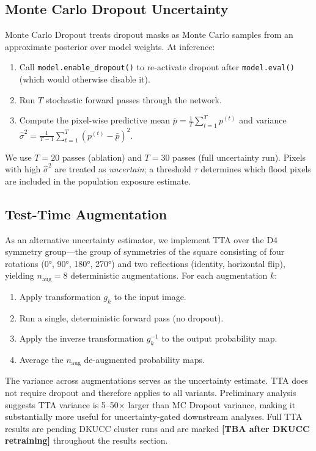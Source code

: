 \documentclass[12pt]{article}
\newcommand{\tbatxt}{\colorbox{pending}{\textbf{[TBA after DKUCC retraining]}}}
\begin{document}
\subsection{Monte Carlo Dropout Uncertainty}
\label{sec:mc}

Monte Carlo Dropout \cite{gal2016dropout} treats dropout masks as Monte Carlo
samples from an approximate posterior over model weights.  At inference:
\begin{enumerate}
  \item Call \texttt{model.enable\_dropout()} to re-activate dropout after
        \texttt{model.eval()} (which would otherwise disable it).
  \item Run $T$ stochastic forward passes through the network.
  \item Compute the pixel-wise predictive mean
        $\bar{p} = \frac{1}{T}\sum_{t=1}^{T} p^{(t)}$ and variance
        $\hat{\sigma}^2 = \frac{1}{T-1}\sum_{t=1}^{T}(p^{(t)} - \bar{p})^2$.
\end{enumerate}
We use $T=20$ passes (ablation) and $T=30$ passes (full uncertainty run).
Pixels with high $\hat{\sigma}^2$ are treated as \emph{uncertain}; a
threshold $\tau$ determines which flood pixels are included in the population
exposure estimate.

\subsection{Test-Time Augmentation}
\label{sec:tta}

As an alternative uncertainty estimator, we implement TTA over the D4
symmetry group—the group of symmetries of the square consisting of four
rotations (0°, 90°, 180°, 270°) and two reflections (identity, horizontal
flip), yielding $n_\text{aug} = 8$ deterministic augmentations.  For
each augmentation $k$:
\begin{enumerate}
  \item Apply transformation $g_k$ to the input image.
  \item Run a single, deterministic forward pass (no dropout).
  \item Apply the inverse transformation $g_k^{-1}$ to the output probability map.
  \item Average the $n_\text{aug}$ de-augmented probability maps.
\end{enumerate}
The variance across augmentations serves as the uncertainty estimate.  TTA
does not require dropout and therefore applies to all variants.  Preliminary
analysis suggests TTA variance is 5–50$\times$ larger than MC Dropout variance,
making it substantially more useful for uncertainty-gated downstream analyses.
Full TTA results are pending DKUCC cluster runs and are marked \tbatxt{}
throughout the results section.
\end{document}
